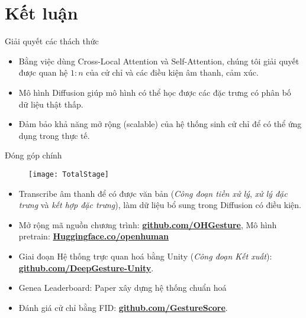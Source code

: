
\section{Kết luận}

\begin{frame}{Giải quyết các thách thức}
		\begin{itemize}
			\item Bằng việc dùng Cross-Local Attention và Self-Attention, chúng tôi giải quyết được quan hệ $1:n$ của cử chỉ và các điều kiện âm thanh, cảm xúc.
			\item Mô hình Diffusion giúp mô hình có thể học được các đặc trưng có phân bố dữ liệu thật thấp.
			\item Đảm bảo khả năng mở rộng (scalable) của hệ thống sinh cử chỉ để có thể ứng dụng trong thực tế.
		\end{itemize}
\end{frame}

\begin{frame}{Đóng góp chính}
	
	\begin{figure}
		\centering
		\texttt{[image: TotalStage]}
	\end{figure}
	
	\begin{itemize}
		\item Transcribe âm thanh để có được văn bản (\textit{Công đoạn tiền xử lý}, \textit{xử lý đặc trưng} và \textit{kết hợp đặc trưng}), làm dữ liệu bổ sung trong Diffusion có điều kiện.
		
		\item Mở rộng mã nguồn chương trình: \hyperlink{https://github.com/hmthanh/OHGesture}{\textbf{github.com/OHGesture}}, Mô hình pretrain: \hyperlink{https://huggingface.co/openhuman/openhuman}{\textbf{Huggingface.co/openhuman}}
		
		\item Giai đoạn Hệ thống trực quan hoá bằng Unity (\textit{Công đoạn Kết xuất}): \hyperlink{https://github.com/DeepGesture/deepgesture-unity}{\textbf{github.com/DeepGesture-Unity}}.
		
		\item Genea Leaderboard: Paper xây dựng hệ thống chuẩn hoá
		
		\item Đánh giá cử chỉ bằng FID: \hyperlink{https://github.com/GestureScore/GestureScore}{\textbf{github.com/GestureScore}}.
	\end{itemize}
\end{frame}

